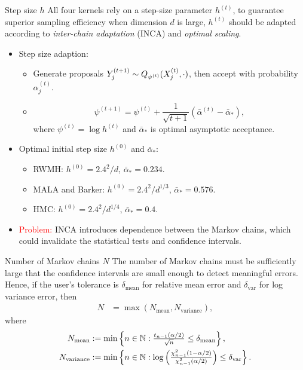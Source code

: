 \documentclass[10pt,xcolor=table]{beamer}
\begin{document}
\begin{frame}{Step size $h$}
All four kernels rely on a step-size parameter $h^{(t)}$, to guarantee superior sampling efficiency when dimension $d$ is large, $h^{(t)}$ should be adapted according to \emph{inter-chain adaptation} (INCA) and \emph{optimal scaling}.
    \begin{itemize}
        \item Step size adaption: 
            \begin{itemize}
                \item Generate proposals 
$Y_{j}^{(t+1)} \sim Q_{\psi^{(t)}}(X_{j}^{(t)}, \cdot)$, then accept with probability $\alpha^{(t)}_{j}$. 
                \item \[
\label{eq:adaptive step size}
\psi^{(t+1)}= \psi^{(t)} +  \frac{1}{\sqrt{t+1}}(\bar\alpha^{(t)} - \bar{\alpha}_{*}),
\]
where $\psi^{(t)} =\log h^{(t)}$ and $\bar{\alpha}_{*}$ is optimal asymptotic acceptance. 
            \end{itemize} \pause
        \item Optimal initial step size $h^{(0)}$ and $\bar{\alpha}_{*}$:
        \begin{itemize}
            \item RWMH: $h^{(0)} = 2.4^2/d$, $\bar{\alpha}_{*} = 0.234$. 
            \item MALA and Barker: $h^{(0)} = {2.4^2}/{d^{1/3}}$, $\bar{\alpha}_{*} = 0.576$.
            \item HMC: $h^{(0)} = {2.4^2}/{d^{1/4}}$, $\bar{\alpha}_{*} = 0.4$.
        \end{itemize} \pause 
        \item \textcolor{red}{Problem:} INCA introduces dependence between the Markov chains, which could invalidate the statistical tests and confidence intervals. 
    \end{itemize}
\end{frame}

\begin{frame}{Number of Markov chains $N$}
The number of Markov chains must be sufficiently large that the confidence intervals are small enough to detect meaningful errors.
Hence, if the user's tolerance is $\delta_{\text{mean}}$ for relative mean error and $\delta_{\text{var}}$ for log variance error, then 
\[
\begin{aligned}
	\label{eq:sample-size}
	\textstyle  N &= \textstyle  \max \left( N_{\text{mean}}, N_{\text{variance}}\right),
\end{aligned}
\]
where 
\[
\begin{aligned}
\textstyle N_{\text{mean}} &:= \textstyle  \min \left\{ n \in \mathbb{N} : \frac{t_{n-1}(\alpha / 2)}{\sqrt{n}} \leq \delta_{\text{mean}} \right\},  \\
\textstyle  N_{\text{variance}} &:=  \textstyle  \min \left\{ n \in \mathbb{N} :  \log\left( \frac{\chi^{2}_{n-1}(1-\alpha/2)}{\chi^{2}_{n-1}(\alpha/2)}\right) \leq \delta_{\text{var}} \right\}.
\end{aligned}
\]
\end{frame}
\end{document}
